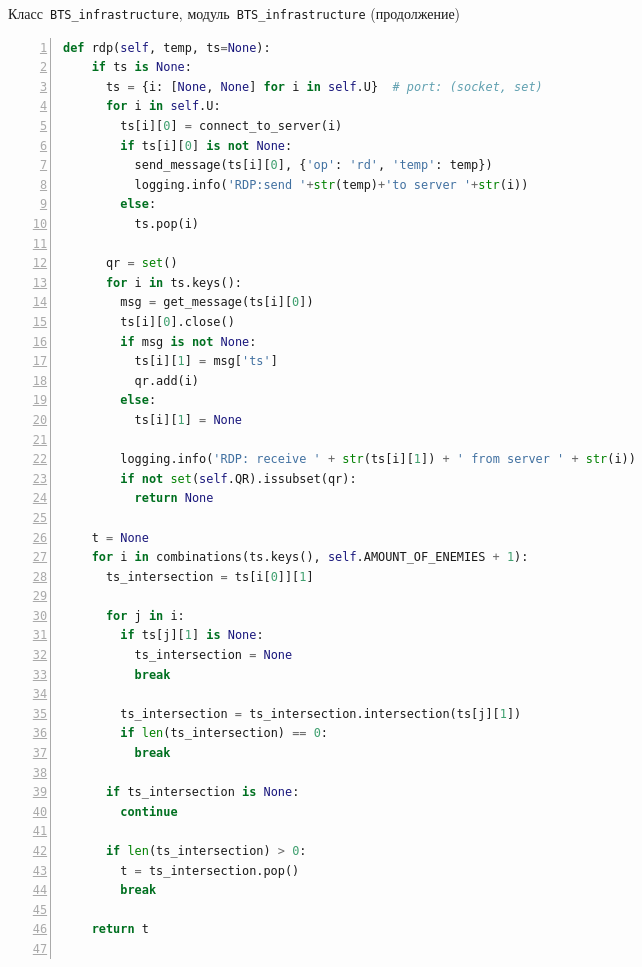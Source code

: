 \begin{ListingEnv}[p]\caption{Класс~\texttt{\small BTS_infrastructure}, модуль~\texttt{\small BTS_infrastructure} (продолжение)}\label{list:bts5}
	\begin{lstlisting}[language=Python, numbers=left]        
  def rdp(self, temp, ts=None):
    if ts is None:
      ts = {i: [None, None] for i in self.U}  # port: (socket, set)
      for i in self.U:
        ts[i][0] = connect_to_server(i)
        if ts[i][0] is not None:
          send_message(ts[i][0], {'op': 'rd', 'temp': temp})
          logging.info('RDP:send '+str(temp)+'to server '+str(i))
        else:
          ts.pop(i)
  
      qr = set()
      for i in ts.keys():
        msg = get_message(ts[i][0])
        ts[i][0].close()
        if msg is not None:
          ts[i][1] = msg['ts']
          qr.add(i)
        else:
          ts[i][1] = None
          
        logging.info('RDP: receive ' + str(ts[i][1]) + ' from server ' + str(i))
        if not set(self.QR).issubset(qr):
          return None
  
    t = None
    for i in combinations(ts.keys(), self.AMOUNT_OF_ENEMIES + 1):
      ts_intersection = ts[i[0]][1]
 
      for j in i:
        if ts[j][1] is None:
          ts_intersection = None
          break
          
        ts_intersection = ts_intersection.intersection(ts[j][1])
        if len(ts_intersection) == 0:
          break
  
      if ts_intersection is None:
        continue
  
      if len(ts_intersection) > 0:
        t = ts_intersection.pop()
        break
  
    return t
	
	\end{lstlisting}
\end{ListingEnv}



